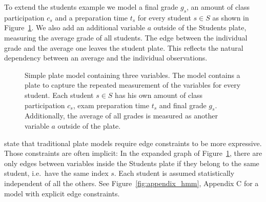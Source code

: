 To extend the students example we model a final grade $g_s$, an amount of class participation $c_s$ and a preparation time $t_s$ for every student $s \in S$ as shown in Figure~\ref{fig:simple_platemodel}. We also add an additional variable $a$ outside of the Students plate, measuring the average grade of all students. The edge between the individual grade and the average one leaves the student plate. This reflects the natural dependency between an average and the individual observations.

\begin{figure}[t]
	\begin{center}
    	\scalebox{\tikzScale}{\adjustTikzSize }
	\end{center}
\caption[Simple plate model containing three variables.]{Simple plate model containing three variables. The model contains a plate to capture the repeated measurement of the variables for every student. Each student $s \in S$ has his own amount of class participation $c_s$, exam preparation time $t_s$ and final grade $g_s$. Additionally, the average of all grades is measured as another variable $a$ outside of the plate.}
		\label{fig:simple_platemodel}
\end{figure}

\textcite{heckerman2007probabilistic} state that traditional plate models require edge constraints to be more expressive. Those constraints are often implicit: In the expanded graph of Figure~\ref{fig:simple_platemodel}, there are only edges between variables inside the Students plate if they belong to the same student, i.e.~have the same index $s$. Each student is assumed statistically independent of all the others. See Figure~\ref{fig:appendix_hmm}, Appendix C for a model with explicit edge constraints.

